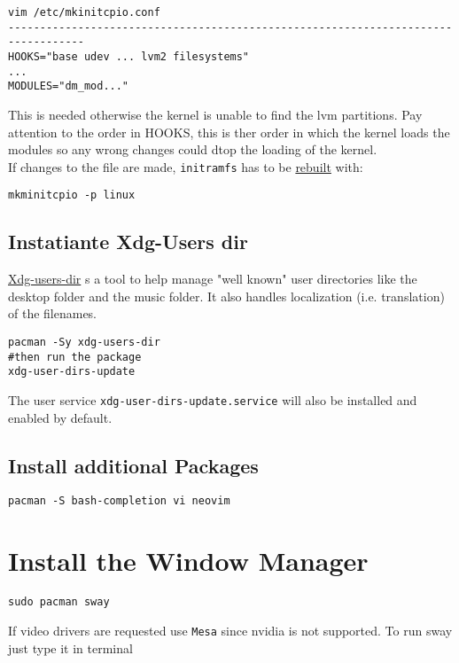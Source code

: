 \documentclass[12pt,A4]{article}
\begin{document}
\begin{verbatim}
vim /etc/mkinitcpio.conf
----------------------------------------------------------------------------------
HOOKS="base udev ... lvm2 filesystems"
...
MODULES="dm_mod..."
\end{verbatim}
This is needed otherwise the kernel is unable to find the lvm partitions. Pay attention to the order in HOOKS, this is ther order in which the kernel loads the modules so any wrong changes could dtop the loading of the kernel.\\
If changes to the file are made, \texttt{initramfs} has to be \href{https://wiki.archlinux.org/index.php/Mkinitcpio#Installation}{rebuilt} with:
\begin{verbatim}
mkminitcpio -p linux
\end{verbatim}

\subsection{Instatiante Xdg-Users dir}
\href{https://wiki.archlinux.org/index.php/XDG_user_directories}{Xdg-users-dir} s a tool to help manage "well known" user directories like the desktop folder and the music folder. It also handles localization (i.e. translation) of the filenames.

\begin{verbatim}
pacman -Sy xdg-users-dir
#then run the package
xdg-user-dirs-update
\end{verbatim}
The user service \texttt{xdg-user-dirs-update.service} will also be installed and enabled by default.
\subsection{Install additional Packages}

\begin{verbatim}
pacman -S bash-completion vi neovim
\end{verbatim}


\section{Install the Window Manager}
\begin{verbatim}
sudo pacman sway
\end{verbatim}
If video drivers are requested use \texttt{Mesa} since nvidia is not supported.
To run sway just type it in terminal
\end{document}
